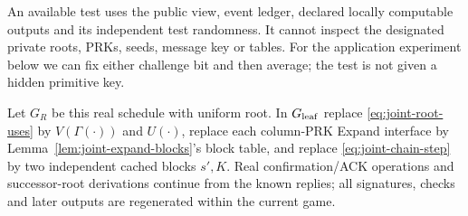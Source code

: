 \documentclass[pdflatex]{sn-jnl}
\theoremstyle{thmstyleone}
\theoremstyle{thmstylethree}
\theoremstyle{thmstyletwo}
\begin{document}
An available test uses the public view, event ledger, declared locally
computable outputs and its independent test randomness. It cannot inspect
the designated private roots, PRKs, seeds, message key or tables. For the
application experiment below we can fix either challenge bit and then
average; the test is not given a hidden primitive key.

Let $G_R$ be this real schedule with uniform root. In $G_{\rm leaf}$ replace
\eqref{eq:joint-root-uses} by $V(\Gamma(\cdot))$ and $U(\cdot)$, replace each
column-PRK Expand interface by Lemma~\ref{lem:joint-expand-blocks}'s block
table, and replace \eqref{eq:joint-chain-step} by two independent cached
blocks $s',K$. Real confirmation/ACK operations and successor-root
derivations continue from the known replies; all signatures, checks and
later outputs are regenerated within the current game.
\end{document}
